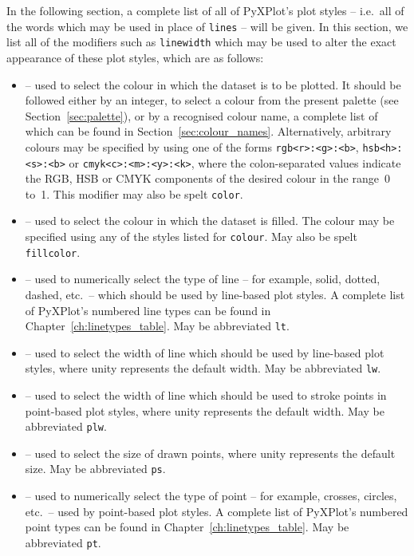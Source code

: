 In the following section, a complete list of all of PyXPlot's plot styles --
i.e.\ all of the words which may be used in place of {\tt lines} -- will be
given. In this section, we list all of the modifiers such as {\tt line\-width}
which may be used to alter the exact appearance of these plot styles, which are
as follows:
\begin{itemize}
\item {} -- used to select the colour in which the dataset is to be plotted. It should be followed either by an integer, to select a colour from the present palette (see Section~\ref{sec:palette}), or by a recognised colour name, a complete list of which can be found in Section~\ref{sec:colour_names}. Alternatively, arbitrary colours may be specified by using one of the forms {\tt rgb<r>:\-<g>:\-<b>}, {\tt hsb<h>:\-<s>:\-<b>} or {\tt cmyk<c>:\-<m>:\-<y>:\-<k>}, where the colon-separated values indicate the RGB, HSB or CMYK components of the desired colour in the range~0 to~1. This modifier may also be spelt {\tt color}.
\item {} -- used to select the colour in which the dataset is filled. The colour may be specified using any of the styles listed for {\tt colour}. May also be spelt {\tt fillcolor}.
\item {} -- used to numerically select the type of line -- for example, solid, dotted, dashed, etc.\ -- which should be used by line-based plot styles. A complete list of PyXPlot's numbered line types can be found in Chapter~\ref{ch:linetypes_table}. May be abbreviated {\tt lt}.
\item {} -- used to select the width of line which should be used by line-based plot styles, where unity represents the default width. May be abbreviated {\tt lw}.
\item {} -- used to select the width of line which should be used to stroke points in point-based plot styles, where unity represents the default width. May be abbreviated {\tt plw}.
\item {} -- used to select the size of drawn points, where unity represents the default size. May be abbreviated {\tt ps}.
\item {} -- used to numerically select the type of point -- for example, crosses, circles, etc.\ -- used by point-based plot styles. A complete list of PyXPlot's numbered point types can be found in Chapter~\ref{ch:linetypes_table}. May be abbreviated {\tt pt}.
\end{itemize}

